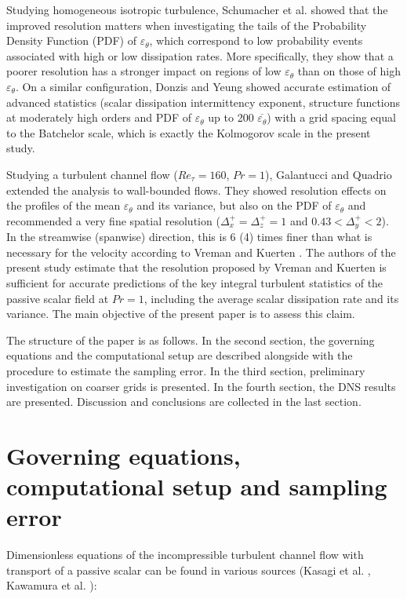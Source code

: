 \documentclass[review]{elsarticle}
\newcommand{\gqcite}{Galantucci and Quadrio \cite{galantucci2010very}}
\newcommand{\epst}{\varepsilon_\theta}
\begin{document}
Studying homogeneous isotropic turbulence, Schumacher et al. \cite{schumacher2005very} showed that the improved resolution matters when investigating the tails of the Probability Density Function (PDF) of $\epst$, which correspond to low probability events associated with high or low dissipation rates. More specifically, they show that a poorer resolution has a stronger impact on regions of low $\epst$ than on those of high $\epst$. On a similar configuration, Donzis and Yeung \cite{donzis2010resolution} showed accurate estimation of advanced statistics (scalar dissipation intermittency exponent, structure functions at moderately high orders and PDF of $\epst$ up to 200 $\overline{\epst}$) with a grid spacing equal to the Batchelor scale, which is exactly the Kolmogorov scale in the present study.

Studying a turbulent channel flow ($Re_\tau=160$, $Pr=1$), \gqcite ~ extended the analysis to wall-bounded flows. They showed resolution effects on the profiles of the mean $\epst$ and its variance, but also on the PDF of $\epst$ and recommended a very fine spatial resolution ($\Delta_x^+=\Delta_z^+=1$ and $0.43<\Delta_y^+<2$). In the streamwise (spanwise) direction, this is 6 (4) times finer than what is necessary for the velocity according to Vreman and Kuerten \cite{vreman2014comparison}. The authors of the present study estimate that the resolution proposed by Vreman and Kuerten is sufficient for accurate predictions of the key {\color{red} integral} turbulent statistics of the passive scalar field at $Pr=1$, including the average scalar dissipation rate and its variance.
{\color{red} The main objective of the present paper is to assess this claim.}

The structure of the paper is as follows. In the second section, the governing equations and the computational setup are described alongside with the procedure to estimate the sampling error. In the third section, preliminary investigation on coarser grids is presented. In the fourth section, the DNS results are presented. Discussion and conclusions are collected in the last section.

\section{Governing equations, computational setup and sampling error}

Dimensionless equations of the incompressible turbulent channel flow with transport of a passive scalar can be found in various sources (Kasagi et al. \cite{kasagi1991direct}, Kawamura et al. \cite{kawamura1998dns}):
\end{document}
